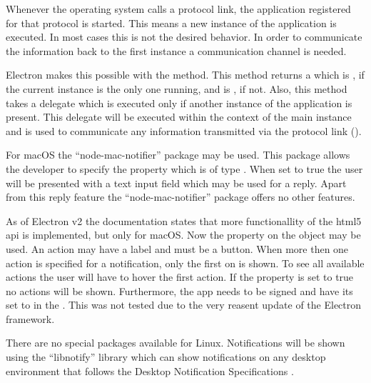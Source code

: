 
Whenever the operating system calls a protocol link, the application registered for that protocol is started. This means a new instance of the application is executed. In most cases this is not the desired behavior. In order to communicate the information back to the first instance a communication channel is needed.


Electron makes this possible with the  method. This method returns a  which is , if the current instance is the only one running, and is , if not. Also, this method takes a delegate which is executed only if another instance of the application is present. This delegate will be executed within the context of the main instance and is used to communicate any information transmitted via the protocol link ().



For macOS the \enquote{node-mac-notifier} package may be used. This package allows the developer to specify the  property which is of type . When set to true the user will be presented with a text input field which may be used for a reply. Apart from this reply feature the \enquote{node-mac-notifier} package offers no other features.

As of Electron v2 the documentation states that more functionallity of the \gls{html}5 \gls{api} is implemented, but only for macOS. Now the  property on the  object may be used. An action may have a label and must be a button. When more then one action is specified for a notification, only the first on is shown. To see all available actions the user will have to hover the first action. If the  property is set to true no actions will be shown. Furthermore, the app needs to be signed and have its  set to  in the . This was not tested due to the very reasent update of the Electron framework.



There are no special packages available for Linux. Notifications will be shown using the \enquote{libnotify} library which can show notifications on any desktop environment that follows the Desktop Notification Specifications \cite{desktopNotificationSpec} \cite{electronNotifications}.
